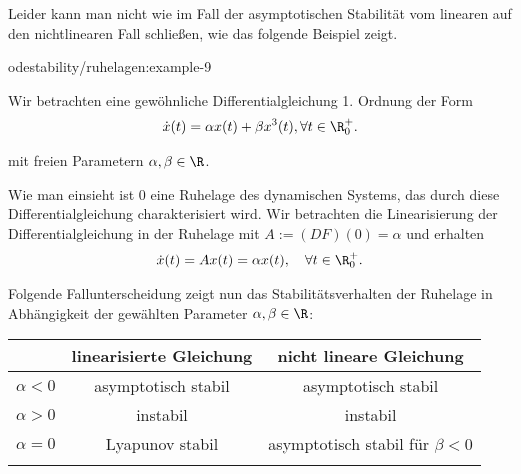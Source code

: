 \documentclass[letterpaper,10pt,english]{jupyterBook}
\begin{document}
\par
Leider kann man nicht wie im Fall der asymptotischen Stabilität vom linearen auf den nichtlinearen Fall schließen, wie das folgende Beispiel zeigt.
\begin{example}{}{odestability/ruhelagen:example-9}



\par
Wir betrachten eine gewöhnliche Differentialgleichung 1. Ordnung der Form
\begin{align*}
\dot{x}(t) = \alpha x(t) + \beta x^3(t), \forall t \in \R^+_0.
\end{align*}
\par
mit freien Parametern \(\alpha, \beta \in \R\).

\par
Wie man einsieht ist \(0\) eine Ruhelage des dynamischen Systems, das durch diese Differentialgleichung charakterisiert wird.
Wir betrachten die Linearisierung der Differentialgleichung in der Ruhelage mit \(A := (DF)(0) = \alpha\) und erhalten
\begin{align*}
\dot{x}(t) = A x(t) = \alpha x(t), \quad \forall t \in \R^+_0.
\end{align*}
\par
Folgende Fallunterscheidung zeigt nun das Stabilitätsverhalten der Ruhelage in Abhängigkeit der gewählten Parameter \(\alpha, \beta \in \R\):


\begin{center}
\centering
\begin{tabularx}{\linewidth}[{\linewidth}]{|c|c|c|}\hline

\par

& 
\par
linearisierte Gleichung
& 
\par
nicht lineare Gleichung
\\
\hline
\par
\(\alpha<0\)
&
\par
asymptotisch stabil
&
\par
asymptotisch stabil
\\
\hline
\par
\(\alpha>0\)
&
\par
instabil
&
\par
instabil
\\
\hline
\par
\(\alpha=0\)
&
\par
Lyapunov stabil
&
\par
asymptotisch stabil für \(\beta<0\)
\\
\hline
\par


\end{tabularx}
\end{center}
\end{example}
\end{document}
